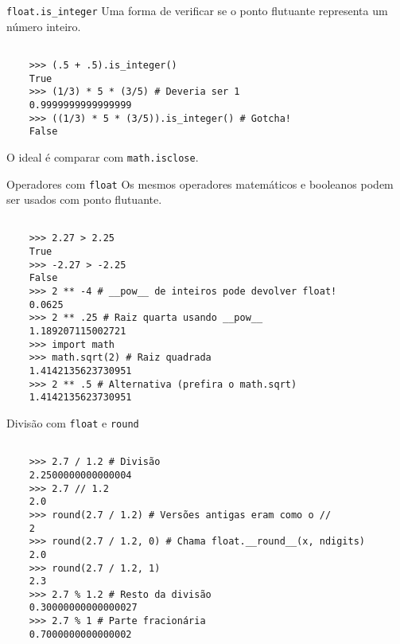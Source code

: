 \documentclass[utf8]{beamer}
\begin{document}
\begin{frame}[fragile]{\texttt{float.is\_integer}}
  Uma forma de verificar se o ponto flutuante
  representa um número inteiro.

  \begin{verbatim}

    >>> (.5 + .5).is_integer()
    True
    >>> (1/3) * 5 * (3/5) # Deveria ser 1
    0.9999999999999999
    >>> ((1/3) * 5 * (3/5)).is_integer() # Gotcha!
    False

  \end{verbatim}

  O ideal é comparar com \texttt{math.isclose}.
\end{frame}


\begin{frame}[fragile]{Operadores com \texttt{float}}
  Os mesmos operadores matemáticos e booleanos
  podem ser usados com ponto flutuante.

  \begin{verbatim}

    >>> 2.27 > 2.25
    True
    >>> -2.27 > -2.25
    False
    >>> 2 ** -4 # __pow__ de inteiros pode devolver float!
    0.0625
    >>> 2 ** .25 # Raiz quarta usando __pow__
    1.189207115002721
    >>> import math
    >>> math.sqrt(2) # Raiz quadrada
    1.4142135623730951
    >>> 2 ** .5 # Alternativa (prefira o math.sqrt)
    1.4142135623730951

  \end{verbatim}
\end{frame}


\begin{frame}[fragile]{Divisão com \texttt{float} e \texttt{round}}
  \begin{verbatim}

    >>> 2.7 / 1.2 # Divisão
    2.2500000000000004
    >>> 2.7 // 1.2
    2.0
    >>> round(2.7 / 1.2) # Versões antigas eram como o //
    2
    >>> round(2.7 / 1.2, 0) # Chama float.__round__(x, ndigits)
    2.0
    >>> round(2.7 / 1.2, 1)
    2.3
    >>> 2.7 % 1.2 # Resto da divisão
    0.30000000000000027
    >>> 2.7 % 1 # Parte fracionária
    0.7000000000000002

  \end{verbatim}
\end{frame}
\end{document}
